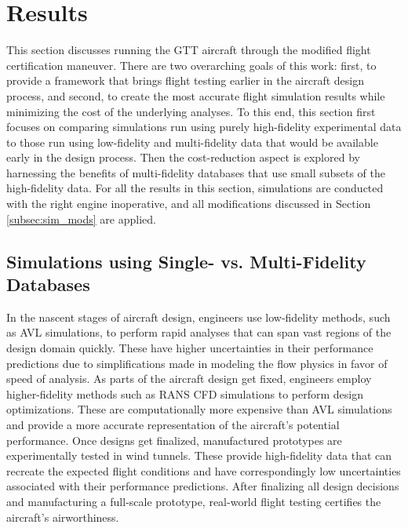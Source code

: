 \section{Results} \label{sec:cba_results}
This section discusses running the GTT aircraft through the modified flight certification maneuver.
There are two overarching goals of this work: first, to provide a framework that brings flight testing earlier in the aircraft design process, and second, to create the most accurate flight simulation results while minimizing the cost of the underlying analyses. 
To this end, this section first focuses on comparing simulations run using purely high-fidelity experimental data to those run using low-fidelity and multi-fidelity data that would be available early in the design process.
Then the cost-reduction aspect is explored by harnessing the benefits of multi-fidelity databases that use small subsets of the high-fidelity data. 
For all the results in this section, simulations are conducted with the right engine inoperative, and all modifications discussed in Section \ref{subsec:sim_mods} are applied.

\subsection{Simulations using Single- vs. Multi-Fidelity Databases} \label{subsec:sf_vs_mf_cba}

In the nascent stages of aircraft design, engineers use low-fidelity methods, such as AVL simulations, to perform rapid analyses that can span vast regions of the design domain quickly. 
These have higher uncertainties in their performance predictions due to simplifications made in modeling the flow physics in favor of speed of analysis.
As parts of the aircraft design get fixed, engineers employ higher-fidelity methods such as RANS CFD simulations to perform design optimizations.
These are computationally more expensive than AVL simulations and provide a more accurate representation of the aircraft's potential performance. 
Once designs get finalized, manufactured prototypes are experimentally tested in wind tunnels. 
These provide high-fidelity data that can recreate the expected flight conditions and have correspondingly low uncertainties associated with their performance predictions.
After finalizing all design decisions and manufacturing a full-scale prototype, real-world flight testing certifies the aircraft's airworthiness.

